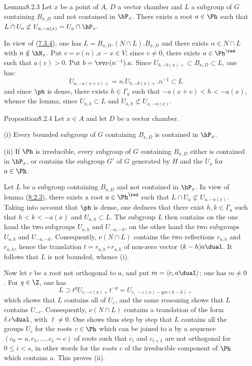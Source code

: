 \documentclass[12pt,a4paper,oneside,english]{smfart}
\makeatletter
\newcommand{\btanchor}[1]{\leavevmode\Hy@raisedlink{\hypertarget{bt:#1}{}}}
\newcommand{\btpageanchor}[1]{\Hy@raisedlink{\hypertarget{p:#1}{}}}
\newcommand{\btref}[1]{\hyperlink{bt:#1}{#1}}
\newcommand{\btpage}[1]{\marginnote{p.~#1}\btpageanchor{#1}}
\newcommand{\pg}[1]{\btpage{#1}}
\theoremstyle{definition}
\theoremstyle{bt}
\makeatother
\begin{document}
\begin{stmt}{Lemma}{8.2.3}\btanchor{8.2.3}
Let $x$ be a point of $A$, $D$ a vector chamber and $L$ a subgroup of $G$ containing
$B_{x,D}$ and not contained in $\hP_x$. There exists a root $a\in\Ph$ such that
$L\cap U_a\not\subset U_{a,-a(x)}=U_a\cap\hP_x$.
\end{stmt}

In view of (\btref{7.3.4}), one has $L=B_{x,D}.(N\cap L).B_{x,D}$ and there exists $n\in N\cap L$
with $n\notin\hN_x$. Put
\pg{195}
$v=\nu(n).x-x\in V$; since $v\neq0$, there exists $a\in\Ph^{\red}$ such that $a(v)>0$.
Put $b=\vv\nu(n^{-1}).a$. Since $U_{b,-b(x)+}\subset B_{x,D}\subset L$, one has:
\[
U_{a,-a(x+v)+}=n.U_{b,-b(x)+}.n^{-1}\subset L
\]
and since $\ph$ is dense, there exists $h\in\Gamma_a$ such that $-a(x+v)<h<-a(x)$,
whence the lemma, since $U_{a,h}\subset L$ and $U_{a,h}\not\subset U_{a,-a(x)}$.

\begin{stmt}{Proposition}{8.2.4}\btanchor{8.2.4}
Let $x\in A$ and let $D$ be a vector chamber.

(i) Every bounded subgroup of $G$ containing $B_{x,D}$ is contained in $\hP_x$.

(ii) If $\Ph$ is irreducible, every subgroup of $G$ containing $B_{x,D}$ either is
contained in $\hP_x$, or contains the subgroup $G'$ of $G$ generated by $H$ and the
$U_a$ for $a\in\Ph$.
\end{stmt}

Let $L$ be a subgroup containing $B_{x,D}$ and not contained in $\hP_x$. In view of
lemma (\btref{8.2.3}), there exists a root $a\in\Ph^{\red}$ such that
$L\cap U_a\not\subset U_{a,-a(x)}$. Taking into account that $\ph$ is dense, one
deduces that there exist $h,k\in\Gamma_a$ such that $h<k<-a(x)$ and $U_{a,h}\subset L$.
The subgroup $L$ then contains on the one hand the two subgroups $U_{a,h}$ and
$U_{-a,-h}$, on the other hand the two subgroups $U_{a,k}$ and $U_{-a,-k}$.
Consequently, $\nu(N\cap L)$ contains the two reflections $r_{a,k}$ and $r_{a,h}$, hence
the translation $t=r_{a,h}\circ r_{a,k}$ of non-zero vector $(k-h)a\dual$. It follows
that $L$ is not bounded, whence (i).

Now let $c$ be a root not orthogonal to $a$, and put $m=\langle c,a\dual\rangle$; one
has $m\neq0$. For $q\in\Z$, one has
\[
L\supset t^qU_{c,-c(x)+}t^{-q}=U_{c,\,-c(x)-qm(k-h)+}
\]
which shows that $L$ contains all of $U_c$, and the same reasoning shows that $L$
contains $U_{-c}$. Consequently, $\nu(N\cap L)$ contains a translation of the form
$\ell.c\dual$, with $\ell\neq0$. One shows thus step by step that $L$ contains all the
groups $U_c$ for the roots $c\in\Ph$ which can be joined to $a$ by a sequence
$(c_0=a,c_1,\dots,c_s=c)$ of roots such that $c_i$ and $c_{i+1}$ are not orthogonal for
$0\leqslant i<s$, in other words for the roots $c$ of the irreducible component of $\Ph$
which contains $a$. This proves (ii).
\end{document}
